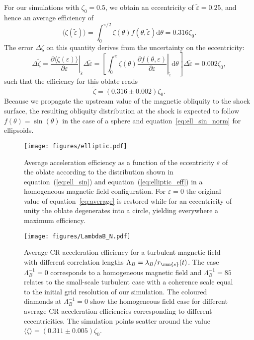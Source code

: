 \documentclass[8pt,a4paper,usenatbib]{mnras}
\newcommand{\de}{\mathrm{d}}
\newcommand{\di}{\partial}
\renewcommand{\epsilon}{\varepsilon}
\begin{document}
For our simulations with
$\zeta_0=0.5$, we obtain an eccentricity of $\tilde{\epsilon} = 0.25$, and hence an
average efficiency of
\begin{equation}
\label{eq:elliptic_eff}
\langle \zeta (\tilde{\epsilon})\rangle = \int_0^{\pi/2} \zeta(\theta) f(\theta,\tilde{\epsilon}) \de \theta= 0.316 \zeta_0.
\end{equation}
The error $\Delta \zeta $ on this quantity derives from the uncertainty on the eccentricity:
\begin{equation}
\Delta \tilde{\zeta} = \left.\dfrac{\di \langle \zeta(\epsilon)\rangle}{\di \epsilon}\right|_{\tilde{\epsilon}} \Delta\tilde{\epsilon} =  \left.\left[\int_0^\pi \zeta(\theta) \dfrac{\di f(\theta,\epsilon)}{\di \epsilon} \right|_{\tilde{\epsilon}} \de \theta \right] \Delta \tilde{\epsilon} = 0.002 \zeta_0 ,
\end{equation}
such that the efficiency for this oblate reads
\begin{equation}
\tilde{\zeta} = (0.316 \pm 0.002) \zeta_0 .
\end{equation}
Because we propagate the upstream value of the magnetic obliquity to the shock
surface, the resulting obliquity distribution at the shock is expected to follow
$f(\theta)=\sin(\theta)$ in the case of a sphere and
equation~\eqref{eq:ell_sin_norm} for ellipsoids.

\begin{figure}
\centering
\texttt{[image: figures/elliptic.pdf]} 
\caption{Average acceleration efficiency as a function of the eccentricity
  $\epsilon$ of the oblate according to the distribution shown in
  equation~(\ref{eq:ell_sin}) and equation~(\ref{eq:elliptic_eff}) in a homogeneous
  magnetic field configuration. For $\epsilon=0$ the original value of
  equation~\eqref{eq:average} is restored while for an eccentricity of unity the
  oblate degenerates into a circle, yielding everywhere a maximum efficiency.}
\label{fig10:ell}
\end{figure}

\begin{figure}
\centering
\texttt{[image: figures/LambdaB\_N.pdf]} 
\caption{Average CR acceleration efficiency for a turbulent magnetic field with
  different correlation lengths $\Lambda_B=\lambda_B/r_{\rmn{s}}(t)$.  The case
  $\Lambda_B^{-1}=0$ corresponds to a homogeneous magnetic field and
  $\Lambda_B^{-1}=85$ relates to the small-scale turbulent case with a coherence
  scale equal to the initial grid resolution of our simulation. The coloured
  diamonds at $\Lambda_B^{-1} = 0$ show the homogeneous field case for different
  average CR acceleration efficiencies corresponding to different
  eccentricities. The simulation points scatter around the value $\langle \zeta
  \rangle = (0.311 \pm 0.005)\zeta_0$.}
  \label{fig11:last}
\end{figure}
\end{document}
